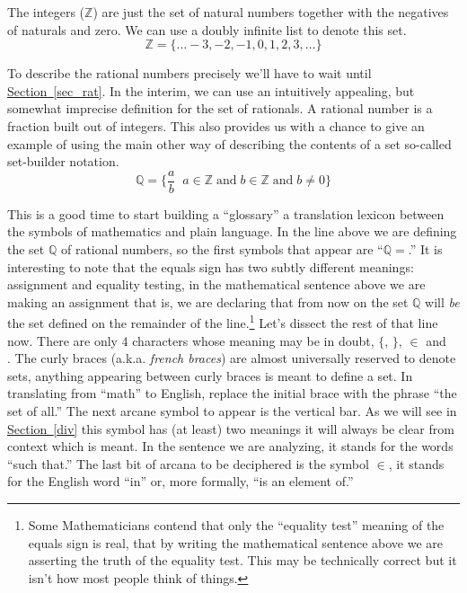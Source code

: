 \documentclass[10pt,]{book}
\theoremstyle{plain}
\theoremstyle{definition}
\theoremstyle{definition}
\numberwithin{equation}{section}
\newcommand{\suchthat}{\;  \;}
\newcommand{\Integers}{{\mathbb Z}}
\newcommand{\Rationals}{{\mathbb Q}}
\begin{document}
    The  integers (\(\Integers\)) are just the set of natural numbers
    together with the negatives of naturals and zero. We can use
    a doubly infinite list to denote this set.
    \begin{equation*}
      \Integers = \{ \ldots -3, -2, -1, 0, 1, 2, 3, \ldots \}
    \end{equation*}
\par

    To describe the  rational numbers precisely we'll have to wait until \hyperref[sec_rat]{Section~\ref{sec_rat}}.
    In the interim, we can use an intuitively appealing, but somewhat imprecise
    definition for the set of rationals. A rational number is a fraction built out
    of integers. This also provides us with
    a chance to give an example of using the main other way of describing
    the contents of a set \textemdash{} so-called  set-builder notation.
    \begin{equation*}
      \Rationals = \{ \frac{a}{b} \suchthat a \in \Integers \; \mbox{and}  \;
      b \in \Integers \; \mbox{and}  \; b \neq 0 \}
    \end{equation*}
\par

    This is a good time to start building a ``glossary'' \textemdash{} a translation lexicon
    between the symbols of mathematics and plain language. In the line
    above we are defining the set \(\Rationals\) of rational numbers, so the
    first symbols that appear are ``\(\Rationals =\).'' It is interesting to
    note that the equals sign has two subtly different meanings: assignment
    and equality testing, in the mathematical sentence above we are
    making an assignment \textemdash{} that is, we are declaring that from now on the set
    \(\Rationals\) will \emph{be} the set defined on the remainder of the
    line.\footnote{Some Mathematicians contend that only the ``equality
      test'' meaning of the equals sign is real, that by writing the
      mathematical sentence above we are asserting the truth of the
      equality test.  This may be technically correct but it isn't how
      most people think of things.\label{fn-2}}
    Let's dissect the rest of that line now. There are only 4
    characters whose meaning may be in doubt, \(\{\), \(\}\), \(\in\) and \(\suchthat\).
    The curly braces (a.k.a. \emph{french braces}) are almost universally
    reserved to denote sets, anything appearing between curly braces is
    meant to define a set. In translating from ``math'' to English,
    replace the initial brace with the phrase ``the set of all.'' The
    next arcane symbol to appear is the vertical bar. As we will see in
    \hyperref[div]{Section~\ref{div}} this symbol has (at least) two meanings \textemdash{} it will
    always be clear from context which is meant. In the sentence we are
    analyzing, it stands for the words ``such that.'' The last bit of
    arcana to be deciphered is the symbol \(\in\), it stands for the English
    word ``in'' or, more formally, ``is an element of.''
\par
\end{document}

